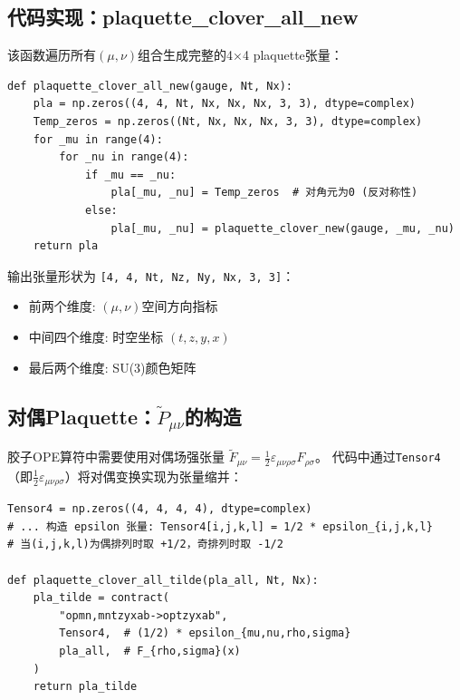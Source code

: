 \documentclass[12pt,a4paper]{ctexart}
\begin{document}
\subsection{代码实现：plaquette\_clover\_all\_new}

该函数遍历所有$(\mu,\nu)$组合生成完整的4×4 plaquette张量：

\begin{codebox}
\begin{lstlisting}[style=pythonstyle]
def plaquette_clover_all_new(gauge, Nt, Nx):
    pla = np.zeros((4, 4, Nt, Nx, Nx, Nx, 3, 3), dtype=complex)
    Temp_zeros = np.zeros((Nt, Nx, Nx, Nx, 3, 3), dtype=complex)
    for _mu in range(4):
        for _nu in range(4):
            if _mu == _nu:
                pla[_mu, _nu] = Temp_zeros  # 对角元为0 (反对称性)
            else:
                pla[_mu, _nu] = plaquette_clover_new(gauge, _mu, _nu)
    return pla
\end{lstlisting}
\end{codebox}

输出张量形状为 \texttt{[4, 4, Nt, Nz, Ny, Nx, 3, 3]}：
\begin{itemize}
    \item 前两个维度: $(\mu,\nu)$空间方向指标
    \item 中间四个维度: 时空坐标 $(t,z,y,x)$
    \item 最后两个维度: SU(3)颜色矩阵
\end{itemize}

\subsection{对偶Plaquette：$\tilde{P}_{\mu\nu}$的构造}

胶子OPE算符中需要使用对偶场强张量 $\tilde{F}_{\mu\nu} = \frac{1}{2}\varepsilon_{\mu\nu\rho\sigma}F_{\rho\sigma}$。
代码中通过\texttt{Tensor4}（即$\frac{1}{2}\varepsilon_{\mu\nu\rho\sigma}$）将对偶变换实现为张量缩并：

\begin{codebox}
\begin{lstlisting}[style=pythonstyle]
Tensor4 = np.zeros((4, 4, 4, 4), dtype=complex)
# ... 构造 epsilon 张量: Tensor4[i,j,k,l] = 1/2 * epsilon_{i,j,k,l}
# 当(i,j,k,l)为偶排列时取 +1/2，奇排列时取 -1/2

def plaquette_clover_all_tilde(pla_all, Nt, Nx):
    pla_tilde = contract(
        "opmn,mntzyxab->optzyxab",
        Tensor4,  # (1/2) * epsilon_{mu,nu,rho,sigma}
        pla_all,  # F_{rho,sigma}(x)
    )
    return pla_tilde
\end{lstlisting}
\end{codebox}
\end{document}
